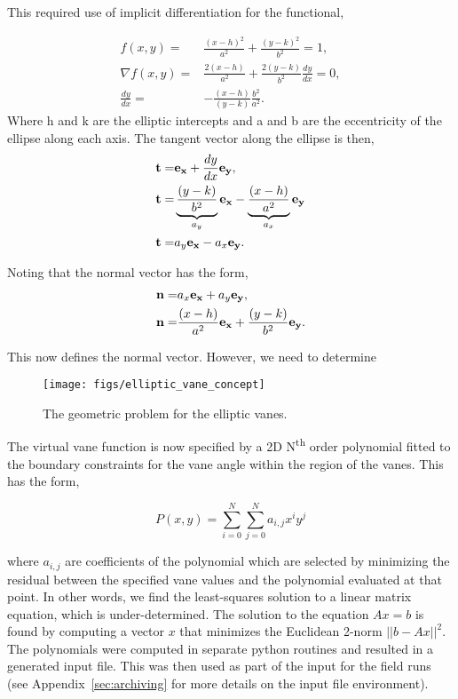 This required use of implicit differentiation for the functional,

\begin{eqnarray}
 f(x,y)  =& \frac{(x-h)^2}{a^2} + \frac{(y-k)^2}{b^2} = 1, \\
 \nabla f(x,y) =& \frac{2 (x-h)}{a^2} + \frac{2 (y-k)}{b^2}\frac{dy}{dx} = 0, \\
 \frac{dy}{dx} =& -\frac{(x-h)}{(y-k)}\frac{b^2}{a^2}. 
\end{eqnarray}
Where h and k are the elliptic intercepts and a and b are the
eccentricity of the ellipse along each axis. The tangent vector along
the ellipse is then,  
\begin{eqnarray}
 {\bf t} =& {\bf e_x} + \frac{dy}{dx}{\bf e_y}, \\
 {\bf t} =& \underbrace{\frac{(y-k)}{b^2}}_{a_y} {\bf e_x} -
  \underbrace{\frac{(x-h)}{a^2}}_{a_x}{\bf e_y} \\
 {\bf t} =& {a_y} {\bf e_x} - {a_x}{\bf e_y}. 
\end{eqnarray}

Noting that the normal vector has the form, 
\begin{eqnarray}
 {\bf n} =& {a_x} {\bf e_x} + {a_y}{\bf e_y}, \\
 {\bf n} =& \frac{(x-h)}{a^2} {\bf e_x} + \frac{(y-k)}{b^2} {\bf e_y}.
\end{eqnarray}

This now defines the normal vector. However, we need to determine



 \begin{figure}[!htb]
  \begin{center}
   \texttt{[image: figs/elliptic\_vane\_concept]}
   \caption{The geometric problem for the elliptic vanes.}
   \label{fig:elliptic_vane_concept}
  \end{center}
 \end{figure}


The virtual vane function is now specified by a 2D N\textsuperscript{th}
order polynomial fitted to the boundary constraints for the vane angle
within the region of the vanes. This has the form, 

\begin{equation}
 P(x,y) = \sum_{i=0}^N  \sum_{j=0}^N a_{i,j} x^i y^j
\end{equation}

where $a_{i,j}$ are coefficients of the polynomial which are selected by
minimizing the residual between the specified vane values and the
polynomial evaluated at that point. In other words, we find the
least-squares solution to a linear matrix equation, which is
under-determined. The solution to the equation $A x = b$ is found by
computing a vector $x$ that minimizes the Euclidean 2-norm $|| b - A x
||^2$. The polynomials were computed in separate python routines and
resulted in a generated input file. This was then used as part of the
input for the field runs (see Appendix~\ref{sec:archiving} for more
details on the input file environment). 

